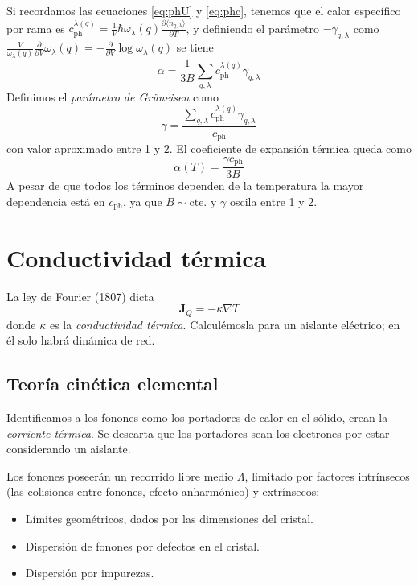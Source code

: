 Si recordamos las ecuaciones \ref{eq:phU} y \ref{eq:phc}, tenemos que
el calor específico por rama es
$c_\text{ph}^{\lambda(q)} = \frac{1}{V} \hbar \omega_\lambda(q) \frac{\partial
  \langle n_{q,\lambda}\rangle}{\partial T}$, y definiendo el
parámetro $-\gamma_{q,\lambda}$  como
$\frac{V}{\omega_\lambda(q)}\frac{\partial}{\partial V} \omega_\lambda
(q) = - \frac{\partial}{\partial V} \log \omega_\lambda (q)$ se tiene
\begin{equation}
  \alpha = \frac{1}{3B} \sum_{q,\lambda} c_\text{ph}^{\lambda(q)} \gamma_{q,\lambda}
\end{equation}
Definimos el \emph{parámetro de Grüneisen} como
\begin{equation}
  \gamma = \frac{\sum_{q,\lambda} c_\text{ph}^{\lambda(q)}
    \gamma_{q,\lambda}}{c_\text{ph}}
\end{equation}
con valor aproximado entre 1 y 2. El coeficiente de expansión térmica
queda como
\begin{equation}
  \alpha (T)= \frac{\gamma c_\text{ph}}{3B}
\end{equation}
A pesar de que todos los términos dependen de la temperatura la mayor
dependencia está en $c_\text{ph}$, ya que $B \sim \text{cte.}$ y
$\gamma$ oscila entre 1 y 2.


\section{Conductividad térmica}
La ley de Fourier (1807) dicta
\begin{equation}
  \mathbf{J}_Q = - \kappa \nabla T
\end{equation}
donde $\kappa$ es la \emph{conductividad térmica}. Calculémosla para
un aislante eléctrico; en él solo habrá dinámica de red.

\subsection{Teoría cinética elemental}
\label{sec:tce}


Identificamos a los fonones como los portadores de calor en el sólido,
crean la \emph{corriente térmica}. Se descarta que los portadores sean
los electrones por estar considerando un aislante.

Los fonones poseerán un recorrido libre medio $\Lambda$, limitado por
factores intrínsecos (las colisiones entre fonones, efecto
anharmónico) y extrínsecos:
\begin{itemize}
\item Límites geométricos, dados por las dimensiones del cristal.
\item Dispersión de fonones por defectos en el cristal.
\item Dispersión por impurezas.
\end{itemize}

